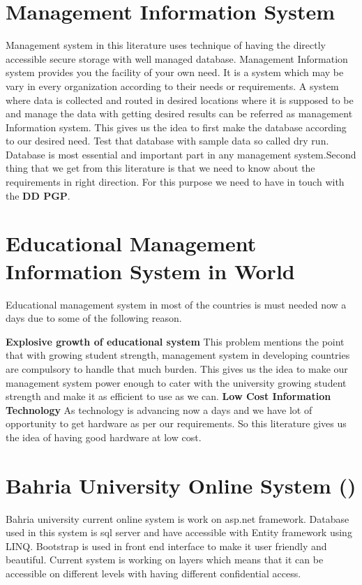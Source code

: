 \section{Management Information System}
Management system in this literature uses technique of having the directly accessible secure storage with well managed database.
Management Information system provides you the facility of your own need. It is a system which may be vary in every organization according to their needs or requirements. A system where data is collected and routed in desired locations where it is supposed to be and manage the data with getting desired results can be referred as management Information system. This gives us the idea to first make the database according to our desired need. Test that database with sample data so called dry run. Database is most essential and important part in any management system.Second thing that we get from this literature is that we need to know about the requirements in right direction. For this purpose we need to have in touch with the \textbf{DD PGP}.

\section{Educational Management Information System in World}

Educational management system in most of the countries is must needed now a days due to some of the following reason.

\textbf{Explosive growth of educational system}
\para This problem mentions the point that with growing student strength, management system in developing countries are compulsory to handle that much burden. This gives us the idea to make our management system power enough to cater with the university growing student strength and make it as efficient to use as we can.
\textbf{Low Cost Information Technology}
\para As technology is advancing now a days and we have lot of opportunity to get hardware as per our requirements. So this literature gives us the idea of having good hardware at low cost.

\section{Bahria University Online System ()}
\para Bahria university current online system is work on asp.net framework. Database used in this system is sql server and have accessible with Entity framework using LINQ. Bootstrap is used in front end interface to make it user friendly and beautiful. Current system is working on layers which means that it can be accessible on different levels with having different confidential access.


